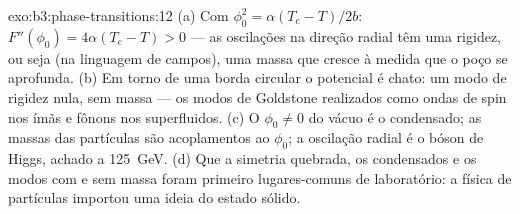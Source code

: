 \begin{solution}{exo:b3:phase-transitions:12}
(a) Com $\phi_0^2 = \alpha(T_{\text{c}} - T)/2b$: $F''(\phi_0) =
4\alpha(T_{\text{c}} - T) > 0$ --- as oscilações na direção
radial têm uma rigidez, ou seja (na linguagem de campos), uma massa que
cresce à medida que o poço se aprofunda. (b) Em torno de uma borda
circular o potencial é chato: um modo de rigidez nula, sem massa --- os
modos de Goldstone realizados como ondas de spin nos ímãs e fônons nos
superfluidos. (c) O $\phi_0 \neq 0$ do vácuo é o condensado;
as massas das partículas são acoplamentos ao $\phi_0$; a oscilação radial
é o bóson de Higgs, achado a \qty{125}{GeV}. (d) Que a simetria
quebrada, os condensados e os modos com e sem massa foram primeiro
lugares-comuns de laboratório: a física de partículas importou uma ideia
do estado sólido.
\end{solution}

